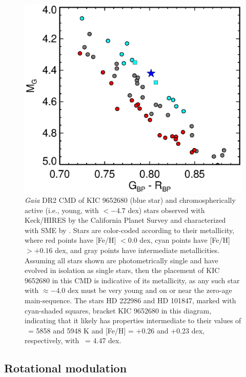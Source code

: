 \begin{figure}
    \centering
    \includegraphics[scale=0.55]{nephelion/KIC-GCPS-v2.eps}
    \caption{\textit{Gaia} DR2 CMD of KIC 9652680 (blue star) and chromospherically active (i.e., young, with \logrprime $< -4.7$ dex) stars observed with Keck/HIRES by the California Planet Survey and characterized with SME 
    by \citet{Brewer2016}. 
    Stars are color-coded according to their 
    metallicity, where red points have [Fe/H] $< 0.0$ dex, 
    cyan points have [Fe/H] $> +0.16$ dex,
    and gray points have intermediate metallicities.
    Assuming all stars shown are photometrically single 
    and have evolved in isolation as single stars,
    then the placement of KIC 9652680 in this CMD is indicative of its 
    metallicity, as any such star with \logrprime $\approx -4.0$ dex
    must be very young and on or near the zero-age main-sequence.
    The stars HD 222986 and HD 101847, marked with cyan-shaded squares, 
    bracket KIC 9652680 in this diagram, indicating that it likely has 
    properties intermediate to their values of \teff\ = 5858 and 5948 K 
    and [Fe/H] = +0.26 and +0.23 dex, respectively, with \logg\ = 4.47 dex.}
    \label{fig:CMDkic}
\end{figure}

\subsection{Rotational modulation}


